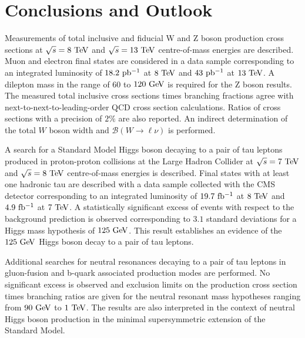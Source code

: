 \chapter{Conclusions and Outlook}

Measurements of total inclusive and fiducial W and Z boson production cross sections at $\sqrt{s}=8~\mathrm{Te\kern -0.1em V}$  and $\sqrt{s}=13~\mathrm{Te\kern -0.1em V}$ centre-of-mass energies are described. Muon and electron final states are considered in a data sample corresponding to an integrated luminosity of $18.2~\mathrm{pb^{-1}}$ at $8~\mathrm{Te\kern -0.1em V}$ and $43~\mathrm{pb^{-1}}$ at $13~\mathrm{Te\kern -0.1em V}$. A dilepton mass in the range of $60$ to $120~\mathrm{Ge\kern -0.1em V}$ is required for the Z boson results. The measured total inclusive cross sections times branching fractions agree with next-to-next-to-leading-order QCD cross section calculations. Ratios of cross sections with a precision of $2\%$ are also reported. An indirect determination of the total $W$ boson width and $\mathcal{B}(W\rightarrow\ell\nu)$ is performed.

A search for a Standard Model Higgs boson decaying to a pair of tau leptons produced in proton-proton collisions at the Large Hadron Collider at $\sqrt{s}=7~\mathrm{Te\kern -0.1em V}$ and $\sqrt{s}=8~\mathrm{Te\kern -0.1em V}$ centre-of-mass energies is described. Final states with at least one hadronic tau are described with a data sample collected with the CMS detector corresponding to an integrated luminosity of $19.7~\mathrm{fb^{-1}}$ at $8~\mathrm{Te\kern -0.1em V}$ and $4.9~\mathrm{fb^{-1}}$ at $7~\mathrm{Te\kern -0.1em V}$. A statistically significant excess of events with respect to the background prediction is observed corresponding to $3.1$ standard deviations for a Higgs mass hypothesis of $125~\mathrm{Ge\kern -0.1em V}$. This result establishes an evidence of the $125~\mathrm{Ge\kern -0.1em V}$ Higgs boson decay to a pair of tau leptons. 

Additional searches for neutral resonances decaying to a pair of tau leptons in gluon-fusion and b-quark associated production modes are performed. No significant excess is observed and exclusion limits on the production cross section times branching ratios are given for the neutral resonant mass hypotheses ranging from $90~\mathrm{Ge\kern -0.1em V}$ to $1~\mathrm{Te\kern -0.1em V}$. The results are also interpreted in the context of neutral Higgs boson production in the minimal supersymmetric extension of the Standard Model. 


